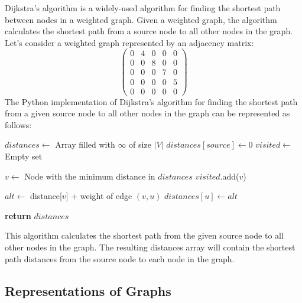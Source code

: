 \documentclass[12pt]{book} %
\begin{document}
Dijkstra's algorithm is a widely-used algorithm for finding the shortest path between nodes in a weighted graph. Given a weighted graph, the algorithm calculates the shortest path from a source node to all other nodes in the graph.
\FloatBarrier
Let's consider a weighted graph represented by an adjacency matrix:
\FloatBarrier
\[ \begin{pmatrix}
0 & 4 & 0 & 0 & 0 \\
0 & 0 & 8 & 0 & 0 \\
0 & 0 & 0 & 7 & 0 \\
0 & 0 & 0 & 0 & 5 \\
0 & 0 & 0 & 0 & 0
\end{pmatrix} \]
\FloatBarrier
The Python implementation of Dijkstra's algorithm for finding the shortest path from a given source node to all other nodes in the graph can be represented as follows:
\FloatBarrier
\begin{algorithm}
\caption{Dijkstra's Algorithm}
\begin{algorithmic}[1]
\State $distances \gets$ Array filled with $\infty$ of size $|V|$ 
\State $distances[source] \gets 0$ 
\State $visited \gets$ Empty set 

    \State $v \gets$ Node with the minimum distance in $distances$ 
    \State $visited$.add($v$) 
    
        \State $alt \gets$ distance[$v$] + weight of edge $(v, u)$
            \State $distances[u] \gets alt$ 
        \EndIf
    \EndFor
\EndWhile

\State \textbf{return} $distances$
\EndProcedure
\end{algorithmic}
\end{algorithm}
\FloatBarrier
This algorithm calculates the shortest path from the given source node to all other nodes in the graph. The resulting distances array will contain the shortest path distances from the source node to each node in the graph.

\subsection{Representations of Graphs}
\end{document}
